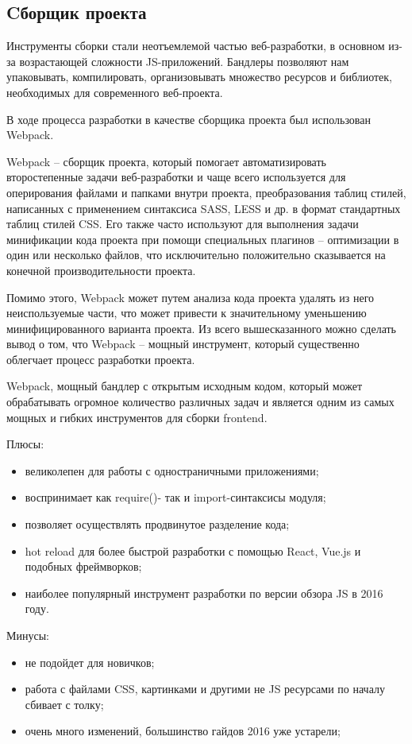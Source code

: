 \subsection{Cборщик проекта}
\label{sec:development:bundler}

Инструменты сборки стали неотъемлемой частью веб-разработки, в основном из-за возрастающей сложности JS-приложений. Бандлеры позволяют нам упаковывать, компилировать, организовывать множество ресурсов и библиотек, необходимых для современного веб-проекта.

В ходе процесса разработки в качестве сборщика проекта был использован Webpack.

Webpack -- сборщик проекта, который помогает автоматизировать второстепенные задачи веб-разработки и чаще всего используется для оперирования файлами и папками внутри проекта, преобразования таблиц стилей, написанных с применением синтаксиса SASS, LESS и др. в формат стандартных таблиц стилей CSS. Его также часто используют для выполнения задачи минификации кода проекта при помощи специальных плагинов -- оптимизации в один или несколько файлов, что исключительно положительно сказывается на конечной производительности проекта.

Помимо этого, Webpack может путем анализа кода проекта удалять из него неиспользуемые части, что может привести к значительному уменьшению минифицированного варианта проекта. Из всего вышесказанного можно сделать вывод о том, что Webpack -- мощный инструмент, который существенно облегчает процесс разработки проекта.

Webpack, мощный бандлер с открытым исходным кодом, который может обрабатывать огромное количество различных задач и является одним из самых мощных и гибких инструментов для сборки frontend. 

Плюсы:

\begin{itemize}
    \item великолепен для работы с одностраничными приложениями;
    \item воспринимает как require()- так и import-синтаксисы модуля;
    \item позволяет осуществлять продвинутое разделение кода;
    \item hot reload для более быстрой разработки с помощью React, Vue.js и подобных  фреймворков;
    \item наиболее популярный инструмент разработки по версии обзора JS в 2016 году.
\end{itemize}

Минусы:

\begin{itemize}
    \item не подойдет для новичков;
    \item работа с файлами CSS, картинками и другими не JS ресурсами по началу сбивает с толку;
    \item очень много изменений, большинство гайдов 2016 уже устарели;
\end{itemize}
